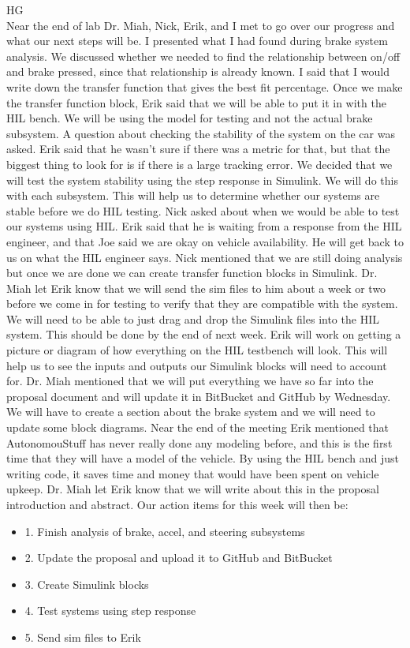 \documentclass[fontsize=11pt, %
                             paper=letter, %
                             openany, %
                             captions=tableheading,
                             index=totoc,
                             hyperref]{labbook}
\begin{document}
\begin{addmargin}[0cm]{0cm}
HG\\ 
Near the end of lab Dr. Miah, Nick, Erik, and I met to go over our progress and what our next steps will be. I presented what I had found during brake system analysis. We discussed whether we needed to find the relationship between on/off and brake pressed, since that relationship is already known. I said that I would write down the transfer function that gives the best fit percentage. Once we make the transfer function block, Erik said that we will be able to put it in with the HIL bench. We will be using the model for testing and not the actual brake subsystem. A question about checking the stability of the system on the car was asked. Erik said that he wasn't sure if there was a metric for that, but that the biggest thing to look for is if there is a large tracking error. We decided that we will test the system stability using the step response in Simulink. We will do this with each subsystem. This will help us to determine whether our systems are stable before we do HIL testing. Nick asked about when we would be able to test our systems using HIL. Erik said that he is waiting from a response from the HIL engineer, and that Joe said we are okay on vehicle availability. He will get back to us on what the HIL engineer says. Nick mentioned that we are still doing analysis but once we are done we can create transfer function blocks in Simulink. Dr. Miah let Erik know that we will send the sim files to him about a week or two before we come in for testing to verify that they are compatible with the system. We will need to be able to just drag and drop the Simulink files into the HIL system. This should be done by the end of next week. Erik will work on getting a picture or diagram of how everything on the HIL testbench will look. This will help us to see the inputs and outputs our Simulink blocks will need to account for. Dr. Miah mentioned that we will put everything we have so far into the proposal document and will update it in BitBucket and GitHub by Wednesday. We will have to create a section about the brake system and we will need to update some block diagrams. Near the end of the meeting Erik mentioned that AutonomouStuff has never really done any modeling before, and this is the first time that they will have a model of the vehicle. By using the HIL bench and just writing code, it saves time and money that would have been spent on vehicle upkeep. Dr. Miah let Erik know that we will write about this in the proposal introduction and abstract. Our action items for this week will then be: 
\begin{itemize}
\item 1. Finish analysis of brake, accel, and steering subsystems
\item 2. Update the proposal and upload it to GitHub and BitBucket
\item 3. Create Simulink blocks
\item 4. Test systems using step response
\item 5. Send sim files to Erik
\end{itemize}
   

\end{addmargin}
\end{document}
